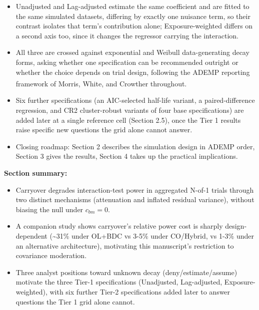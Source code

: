\documentclass[
  11pt,
]{article}
\providecommand{\tightlist}{%
  \setlength{\itemsep}{0pt}\setlength{\parskip}{0pt}}
\begin{document}
\begin{itemize}
  \begin{itemize}
  \tightlist
  \item
    Unadjusted: the binary on-drug indicator, ignoring carryover
    entirely, serving as the benchmark any remedy must beat.
  \item
    Lag-adjusted: augments it with a lagged just-off-drug term
    estimating carryover magnitude without assuming a functional
    form, following the classical crossover-trial device of Jones and
    Kenward\textsuperscript{}.
  \item
    Exposure-weighted: a continuous indicator committing to a
    parametric decay form and half-life, the current pmsimstats-ng
    default.
  \end{itemize}
\item
  Unadjusted and Lag-adjusted estimate the same coefficient and are
  fitted to the same simulated datasets, differing by exactly one
  nuisance term, so their contrast isolates that term's contribution
  alone; Exposure-weighted differs on a second axis too, since it
  changes the regressor carrying the interaction.
\item
  All three are crossed against exponential and Weibull
  data-generating decay forms, asking whether one specification can
  be recommended outright or whether the choice depends on trial
  design, following the ADEMP reporting framework of Morris, White,
  and Crowther\textsuperscript{} throughout.
\item
  Six further specifications (an AIC-selected half-life variant, a
  paired-difference regression, and CR2 cluster-robust variants of
  four base specifications) are added later at a single reference
  cell (Section 2.5), once the Tier 1 results raise specific new
  questions the grid alone cannot answer.
\item
  Closing roadmap: Section 2 describes the simulation design in ADEMP
  order, Section 3 gives the results, Section 4 takes up the
  practical implications.
\end{itemize}

\textbf{Section summary:}

\begin{itemize}
\tightlist
\item
  Carryover degrades interaction-test power in aggregated N-of-1
  trials through two distinct mechanisms (attenuation and inflated
  residual variance), without biasing the null under \(c_{bm}=0\).
\item
  A companion study shows carryover's relative power cost is sharply
  design-dependent (\textasciitilde31\% under OL+BDC vs 3-5\% under CO/Hybrid, vs
  1-3\% under an alternative architecture), motivating this
  manuscript's restriction to covariance moderation.
\item
  Three analyst positions toward unknown decay (deny/estimate/assume)
  motivate the three Tier-1 specifications (Unadjusted, Lag-adjusted,
  Exposure-weighted), with six further Tier-2 specifications added
  later to answer questions the Tier 1 grid alone cannot.
\end{itemize}
\end{document}

